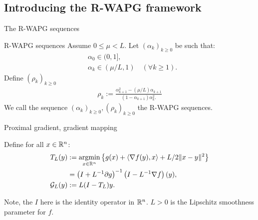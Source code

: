 \documentclass[11pt]{beamer}
\theoremstyle{definition}
\begin{document}
    \subsection{Introducing the R-WAPG framework}
        \begin{frame}{The R-WAPG sequences}
            \begin{definition}{R-WAPG sequences}\label{def:rwapg-seq}
                Assume $0 \le \mu < L$. 
                Let $(\alpha_k)_{k \ge 0}$ be such that: 
                \begin{align*}
                    & \alpha_0 \in (0, 1], \\
                    & \alpha_k \in (\mu/L, 1) \quad (\forall k \ge 1). 
                \end{align*}    
                Define $(\rho_k)_{k \ge 0}$
                \begin{align*}
                    \rho_k := \frac{\alpha_{k + 1}^2 - (\mu/L) \alpha_{k + 1}}{
                        (1 - \alpha_{k + 1}) \alpha_k^2.
                    }
                \end{align*}
                We call the sequence $(\alpha_k)_{k \ge 0}, (\rho_k)_{k \ge0}$ the R-WAPG sequences. 
            \end{definition}
        \end{frame}
        \begin{frame}{Proximal gradient, gradient mapping}
            \begin{definition}
                Define for all $x\in \mathbb R^n$: 
                \begin{align*}
                    T_L(y) 
                    &:= \mathop{\rm argmin}\limits_{x \in \mathbb R^n} \left\lbrace
                        g(x) + \langle \nabla f(y), x\rangle + L/2\Vert x - y\Vert^2
                    \right\rbrace 
                    \\
                    &= \left(I + L^{-1}\partial g\right)^{-1}
                    \left(I - L^{-1}\nabla f\right)(y),
                    \\
                    \mathcal G_L(y)
                    &:= L(I - T_L)y.
                \end{align*}
            \end{definition}
            Note, the $I$ here is the identity operator in $\mathbb R^n$. 
            $L > 0$ is the Lipschitz smoothness parameter for $f$. 
        \end{frame}
\end{document}
